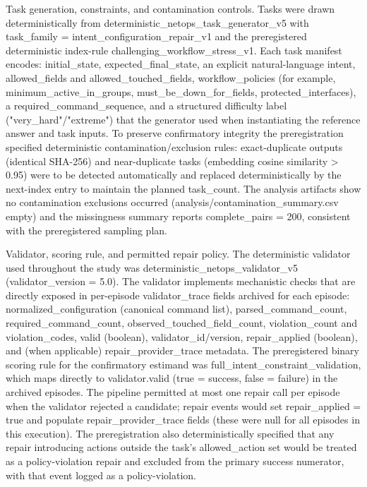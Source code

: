 \documentclass[conference]{IEEEtran}
\begin{document}
Task generation, constraints, and contamination controls. Tasks were drawn deterministically from deterministic\_netops\_task\_generator\_v5 with task\_family = intent\_configuration\_repair\_v1 and the preregistered deterministic index-rule challenging\_workflow\_stress\_v1. Each task manifest encodes: initial\_state, expected\_final\_state, an explicit natural-language intent, allowed\_fields and allowed\_touched\_fields, workflow\_policies (for example, minimum\_active\_in\_groups, must\_be\_down\_for\_fields, protected\_interfaces), a required\_command\_sequence, and a structured difficulty label ("very\_hard"/"extreme") that the generator used when instantiating the reference answer and task inputs. To preserve confirmatory integrity the preregistration specified deterministic contamination/exclusion rules: exact-duplicate outputs (identical SHA-256) and near-duplicate tasks (embedding cosine similarity > 0.95) were to be detected automatically and replaced deterministically by the next-index entry to maintain the planned task\_count. The analysis artifacts show no contamination exclusions occurred (analysis/contamination\_summary.csv empty) and the missingness summary reports complete\_pairs = 200, consistent with the preregistered sampling plan.

Validator, scoring rule, and permitted repair policy. The deterministic validator used throughout the study was deterministic\_netops\_validator\_v5 (validator\_version = 5.0). The validator implements mechanistic checks that are directly exposed in per-episode validator\_trace fields archived for each episode: normalized\_configuration (canonical command list), parsed\_command\_count, required\_command\_count, observed\_touched\_field\_count, violation\_count and violation\_codes, valid (boolean), validator\_id/version, repair\_applied (boolean), and (when applicable) repair\_provider\_trace metadata. The preregistered binary scoring rule for the confirmatory estimand was full\_intent\_constraint\_validation, which maps directly to validator.valid (true = success, false = failure) in the archived episodes. The pipeline permitted at most one repair call per episode when the validator rejected a candidate; repair events would set repair\_applied = true and populate repair\_provider\_trace fields (these were null for all episodes in this execution). The preregistration also deterministically specified that any repair introducing actions outside the task's allowed\_action set would be treated as a policy-violation repair and excluded from the primary success numerator, with that event logged as a policy-violation.
\end{document}
